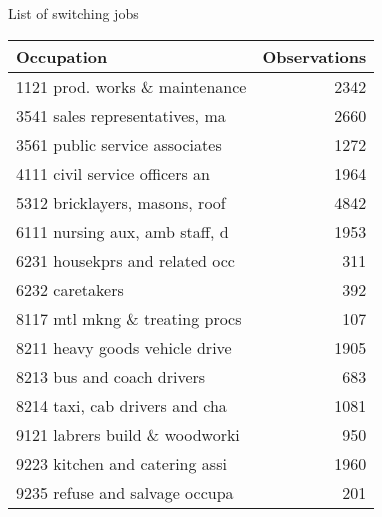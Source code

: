 \begin{center}
\begin{threeparttable}[!h]
\caption{List of switching jobs}
\begin{tabular}{lr}
\toprule
\toprule
\textbf{Occupation}&\multicolumn{1}{c}{\textbf{Observations}} \\
\midrule
\hline
1121 prod. works \& maintenance&2342 \\
3541 sales representatives, ma&2660 \\
3561 public service associates&1272 \\
4111 civil service officers an&1964 \\
5312 bricklayers, masons, roof&4842 \\
6111 nursing aux, amb staff, d&1953 \\
6231 housekprs and related occ&311 \\
6232 caretakers&392 \\
8117 mtl mkng \& treating procs&107 \\
8211 heavy goods vehicle drive&1905 \\
8213 bus and coach drivers&683 \\
8214 taxi, cab drivers and cha&1081 \\
9121 labrers build \& woodworki&950 \\
9223 kitchen and catering assi&1960 \\
9235 refuse and salvage occupa&201 \\
\bottomrule
\bottomrule
\end{tabular}
\end{threeparttable}
\end{center}
